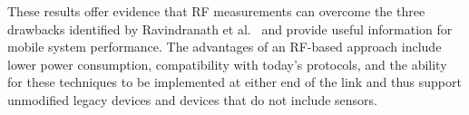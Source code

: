 These results offer evidence that RF measurements can overcome the three drawbacks identified by Ravindranath et al.~\cite{Ravindranath_SensorHints} and provide useful information for mobile system performance. The advantages of an RF-based approach include lower power consumption, compatibility with today's protocols, and the ability for these techniques to be implemented at either end of the link and thus support unmodified legacy devices and devices that do not include sensors.




